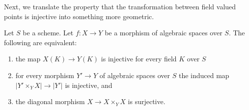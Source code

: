 \noindent
Next, we translate the property that the transformation between field valued
points is injective into something more geometric.

\begin{lemma}
\label{lemma-universally-injective}
Let $S$ be a scheme.
Let $f : X \to Y$ be a morphism of algebraic spaces over $S$.
The following are equivalent:
\begin{enumerate}
\item the map $X(K) \to Y(K)$ is injective for every field $K$ over $S$
\item for every morphism $Y' \to Y$ of algebraic spaces over $S$
the induced map $|Y' \times_Y X| \to |Y'|$ is injective, and
\item the diagonal morphism $X \to X \times_Y X$ is surjective.
\end{enumerate}
\end{lemma}

